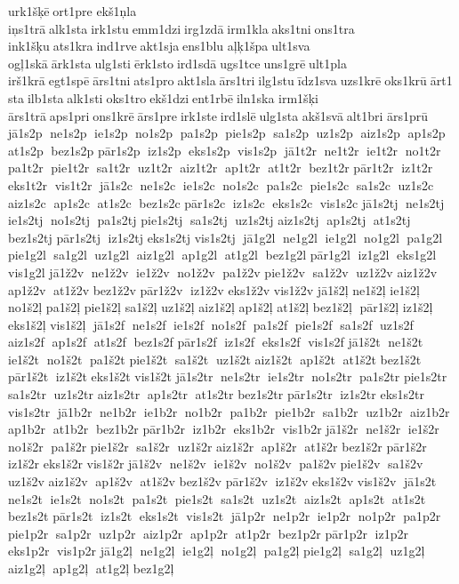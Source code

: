 urk1šķē ort1pre 	ekš1ņla 	iņs1trā alk1sta irk1stu emm1dzi irg1zdā irm1kla aks1tni ons1tra 	ink1šķu ats1kra ind1rve akt1sja ens1blu 
aļķ1špa ult1sva 	ogļ1skā ārk1sta ulg1sti ērk1sto ird1sdā ugs1tce uns1grē ult1pla 	irš1krā egt1spē ārs1tni ats1pro akt1sla ārs1tri ilg1stu īdz1sva uzs1krē oks1krū ārt1sta ilb1sta alk1sti oks1tro ekš1dzi ent1rbē iln1ska 	irm1šķi 	ārs1trā aps1pri ons1krē ārs1pre irk1ste ird1slē ulg1sta 	akš1svā alt1bri 	ārs1prū  jā1s2p  ne1s2p  ie1s2p  no1s2p  pa1s2p  pie1s2p  sa1s2p  uz1s2p  aiz1s2p  ap1s2p  at1s2p  bez1s2p 	 pār1s2p  iz1s2p  eks1s2p  vis1s2p  jā1t2r  ne1t2r  ie1t2r  no1t2r  pa1t2r  pie1t2r  sa1t2r  uz1t2r  aiz1t2r  ap1t2r  at1t2r  bez1t2r 	 pār1t2r  iz1t2r  eks1t2r  vis1t2r  jā1s2c  ne1s2c  ie1s2c  no1s2c  pa1s2c  pie1s2c  sa1s2c  uz1s2c  aiz1s2c  ap1s2c  at1s2c  bez1s2c 	 pār1s2c  iz1s2c  eks1s2c  vis1s2c 	 jā1s2tj  ne1s2tj  ie1s2tj  no1s2tj  pa1s2tj 	 pie1s2tj  sa1s2tj  uz1s2tj 	 aiz1s2tj  ap1s2tj  at1s2tj 	 bez1s2tj 
 pār1s2tj  iz1s2tj 	 eks1s2tj 	 vis1s2tj  jā1g2l  ne1g2l  ie1g2l  no1g2l  pa1g2l  pie1g2l  sa1g2l  uz1g2l  aiz1g2l  ap1g2l  at1g2l  bez1g2l 	 pār1g2l  iz1g2l  eks1g2l  vis1g2l 	 jā1ž2v  ne1ž2v  ie1ž2v  no1ž2v  pa1ž2v 	 pie1ž2v  sa1ž2v  uz1ž2v 	 aiz1ž2v  ap1ž2v  at1ž2v 	 bez1ž2v 
 pār1ž2v  iz1ž2v 	 eks1ž2v 	 vis1ž2v 
 jā1š2ļ 	 ne1š2ļ 	 ie1š2ļ 	 no1š2ļ 	 pa1š2ļ 
 pie1š2ļ 	 sa1š2ļ 	 uz1š2ļ 
 aiz1š2ļ 	 ap1š2ļ 	 at1š2ļ 
 bez1š2ļ  pār1š2ļ 	 iz1š2ļ 
 eks1š2ļ 
 vis1š2ļ  jā1s2f  ne1s2f  ie1s2f  no1s2f  pa1s2f  pie1s2f  sa1s2f  uz1s2f  aiz1s2f  ap1s2f  at1s2f  bez1s2f 	 pār1s2f  iz1s2f  eks1s2f  vis1s2f 	 jā1š2t  ne1š2t  ie1š2t  no1š2t  pa1š2t 	 pie1š2t  sa1š2t  uz1š2t 	 aiz1š2t  ap1š2t  at1š2t 	 bez1š2t 
 pār1š2t  iz1š2t 	 eks1š2t 	 vis1š2t 	 jā1s2tr  ne1s2tr  ie1s2tr  no1s2tr  pa1s2tr 	 pie1s2tr  sa1s2tr  uz1s2tr 	 aiz1s2tr  ap1s2tr  at1s2tr 	 bez1s2tr 
 pār1s2tr  iz1s2tr 	 eks1s2tr 	 vis1s2tr  jā1b2r  ne1b2r  ie1b2r  no1b2r  pa1b2r  pie1b2r  sa1b2r  uz1b2r  aiz1b2r  ap1b2r  at1b2r  bez1b2r 	 pār1b2r  iz1b2r  eks1b2r  vis1b2r 	 jā1š2r  ne1š2r  ie1š2r  no1š2r  pa1š2r 	 pie1š2r  sa1š2r  uz1š2r 	 aiz1š2r  ap1š2r  at1š2r 	 bez1š2r 
 pār1š2r  iz1š2r 	 eks1š2r 	 vis1š2r 	 jā1š2v  ne1š2v  ie1š2v  no1š2v  pa1š2v 	 pie1š2v  sa1š2v  uz1š2v 	 aiz1š2v  ap1š2v  at1š2v 	 bez1š2v 
 pār1š2v  iz1š2v 	 eks1š2v 	 vis1š2v  jā1s2t  ne1s2t  ie1s2t  no1s2t  pa1s2t  pie1s2t  sa1s2t  uz1s2t  aiz1s2t  ap1s2t  at1s2t  bez1s2t 	 pār1s2t  iz1s2t  eks1s2t  vis1s2t  jā1p2r  ne1p2r  ie1p2r  no1p2r  pa1p2r  pie1p2r  sa1p2r  uz1p2r  aiz1p2r  ap1p2r  at1p2r  bez1p2r 	 pār1p2r  iz1p2r  eks1p2r  vis1p2r 	 jā1g2ļ  ne1g2ļ  ie1g2ļ  no1g2ļ  pa1g2ļ 	 pie1g2ļ  sa1g2ļ  uz1g2ļ 	 aiz1g2ļ  ap1g2ļ  at1g2ļ 	 bez1g2ļ 
